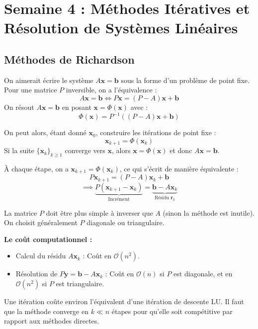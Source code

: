 \section{Semaine 4 : Méthodes Itératives et Résolution de Systèmes Linéaires}

\subsection{Méthodes de Richardson}

On aimerait écrire le système $A\mathbf{x} = \mathbf{b}$ sous la forme d'un problème de point fixe. 
Pour une matrice $P$ inversible, on a l'équivalence :
$$A\mathbf{x} = \mathbf{b} \iff P\mathbf{x} = (P-A)\mathbf{x} + \mathbf{b}$$
On résout $A\mathbf{x} = \mathbf{b}$ en posant $\mathbf{x} = \Phi(\mathbf{x})$ avec :
$$\Phi(\mathbf{x}) = P^{-1}((P-A)\mathbf{x} + \mathbf{b})$$

On peut alors, étant donné $\mathbf{x}_0$, construire les itérations de point fixe :
$$\mathbf{x}_{k+1} = \Phi(\mathbf{x}_k)$$
Si la suite $\{\mathbf{x}_k\}_{k \ge 1}$ converge vers $\mathbf{x}$, alors $\mathbf{x} = \Phi(\mathbf{x})$ et donc $A\mathbf{x} = \mathbf{b}$.

À chaque étape, on a $\mathbf{x}_{k+1} = \Phi(\mathbf{x}_k)$, ce qui s'écrit de manière équivalente :
$$P\mathbf{x}_{k+1} = (P-A)\mathbf{x}_k + \mathbf{b}$$
$$\implies \underbrace{P(\mathbf{x}_{k+1} - \mathbf{x}_k)}_{\text{Incrément}} = \underbrace{\mathbf{b} - A\mathbf{x}_k}_{\text{Résidu } \mathbf{r}_k}$$

\begin{remarque}
La matrice $P$ doit être plus simple à inverser que $A$ (sinon la méthode est inutile). On choisit généralement $P$ diagonale ou triangulaire.
\end{remarque}

\textbf{Le coût computationnel :}
\begin{itemize}
    \item Calcul du résidu $A\mathbf{x}_k$ : Coût en $\mathcal{O}(n^2)$.
    \item Résolution de $P\mathbf{y} = \mathbf{b} - A\mathbf{x}_k$ : Coût en $\mathcal{O}(n)$ si $P$ est diagonale, et en $\mathcal{O}(n^2)$ si $P$ est triangulaire.
\end{itemize}
Une itération coûte environ l'équivalent d'une itération de descente LU. Il faut que la méthode converge en $k \ll n$ étapes pour qu'elle soit compétitive par rapport aux méthodes directes.

